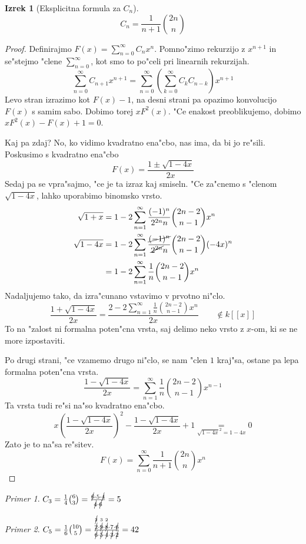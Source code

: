 \documentclass[a4paper,12pt]{article}
\theoremstyle{definition}
\newtheorem{theorem}[counter]{Izrek}
\theoremstyle{remark}
\newtheorem*{ex}{Primer}
\begin{document}
\begin{theorem}[Eksplicitna formula za $C_n$]
	\[C_n = \frac{1}{n + 1} \binom{2n}{n}\]
\end{theorem}
\begin{proof}
	Definirajmo $F(x) = \sum_{n = 0}^{\infty} C_n x^n$.
	Pomno"zimo rekurzijo z $x^{n + 1}$ in se"stejmo "clene $\sum_{n = 0}^{\infty}$, kot smo to po"celi pri linearnih rekurzijah.
	\[\sum_{n = 0}^{\infty} C_{n + 1} x^{n + 1} = \sum_{n = 0}^{\infty} (\sum_{k = 0}^{\infty} C_k C_{n-k}) x^{n + 1}\]
	Levo stran izrazimo kot $F(x) - 1$, na desni strani pa opazimo konvolucijo $F(x)$ s samim sabo. Dobimo torej $x F^2(x)$. "Ce enakost preoblikujemo, dobimo $x F^2(x) - F(x) + 1 = 0$.

	Kaj pa zdaj? No, ko vidimo kvadratno ena"cbo, nas ima, da bi jo re"sili. Poskusimo s kvadratno ena"cbo
	\[F(x) = \frac{1 \pm \sqrt{1 - 4x}}{2x}\]
	Sedaj pa se vpra"sajmo, "ce je ta izraz kaj smiseln. "Ce za"cnemo s "clenom $\sqrt{1-4x}$, lahko uporabimo binomsko vrsto.
	\begin{align*}
		\sqrt{1 + x} &= 1 - 2\sum_{n = 1}^{\infty} \frac{(-1)^n}{2^{2n}n} \binom{2n - 2}{n - 1} x^n\\
		\sqrt{1 - 4x} &= 1 - 2\sum_{n = 1}^{\infty} \frac{\cancel{(-1)^n}}{\cancel{2^{2n}}n} \binom{2n - 2}{n - 1} (-4x)^n\\
		&= 1 - 2\sum_{n = 1}^{\infty} \frac{1}{n} \binom{2n - 2}{n - 1} x^n
	\end{align*}
	Nadaljujemo tako, da izra"cunano vstavimo v prvotno ni"clo.
	\[\frac{1 + \sqrt{1 - 4x}}{2x} = \frac{2 - 2\sum_{n = 1}^{\infty} \frac{1}{n} \binom{2n - 2}{n - 1} x^n}{2x} \qquad \notin k[[x]] \]
	To na "zalost ni formalna poten"cna vrsta, saj delimo neko vrsto z $x$-om, ki se ne more izpostaviti.

	Po drugi strani, "ce vzamemo drugo ni"clo, se nam "clen $1$ kraj"sa, ostane pa lepa formalna poten"cna vrsta.
	\[\frac{1 - \sqrt{1 - 4x}}{2x} = \sum_{n = 1}^{\infty} \frac{1}{n} \binom{2n - 2}{n - 1} x^{n - 1}\]
	Ta vrsta tudi re"si na"so kvadratno ena"cbo.
	\[x (\frac{1 - \sqrt{1 - 4x}}{2x})^2 - \frac{1 - \sqrt{1 - 4x}}{2x} + 1 \underset{\sqrt{1 - 4x}^2 = 1 - 4x}{=} 0\]
	Zato je to na"sa re"sitev.
	\[F(x) = \sum_{n = 0}^{\infty} \frac{1}{n + 1} \binom{2n}{n} x^n\]
\end{proof}

\begin{ex}
	$C_3 = \frac{1}{4} \binom{6}{3} = \frac{\cancel{6} \cdot 5 \cdot \cancel{4}}{\cancel{4} \cdot \cancel{6}} = 5$
\end{ex}
\begin{ex}
	$C_5 = \frac{1}{6} \binom{10}{5} = \frac{\overset{\cancel{2}}{\cancel{2}} \cdot \overset{3}{\cancel{9}} \cdot \overset{2}{\cancel{8}} \cdot 7 \cdot \cancel{6}}{\cancel{6} \cdot \cancel{5} \cdot \cancel{4} \cdot \cancel{3} \cdot \cancel{2}} = 42$
\end{ex}
\end{document}
